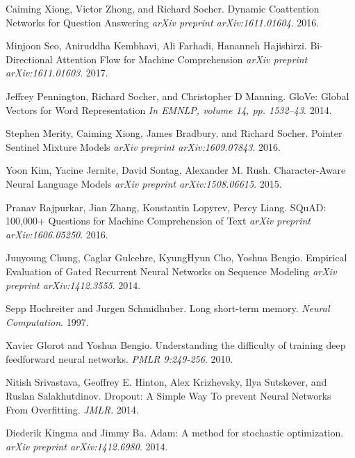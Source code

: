 \documentclass{article} %
\begin{document}
\begin{thebibliography}{1}

\small{

 Caiming Xiong, Victor Zhong, and Richard Socher. Dynamic Coattention Networks for Question Answering
 {\em arXiv preprint arXiv:1611.01604}. 2016.

Minjoon Seo, Aniruddha Kembhavi, Ali Farhadi, Hananneh Hajishirzi. Bi-Directional Attention Flow for Machine Comprehension
 {\em arXiv preprint arXiv:1611.01603}. 2017.

Jeffrey Pennington, Richard Socher, and Christopher D Manning. GloVe: Global Vectors for Word Representation
 {\em In EMNLP, volume 14, pp. 1532–43}. 2014.

Stephen Merity, Caiming Xiong, James Bradbury, and Richard Socher. Pointer Sentinel Mixture Models
 {\em arXiv preprint arXiv:1609.07843}. 2016.

Yoon Kim, Yacine Jernite, David Sontag, Alexander M. Rush. Character-Aware Neural Language Models
 {\em arXiv preprint arXiv:1508.06615}. 2015.

Pranav Rajpurkar, Jian Zhang, Konstantin Lopyrev, Percy Liang. SQuAD: 100,000+ Questions for Machine Comprehension of Text
 {\em arXiv preprint arXiv:1606.05250}. 2016.

Junyoung Chung, Caglar Gulcehre, KyungHyun Cho, Yoshua Bengio. 
Empirical Evaluation of Gated Recurrent Neural Networks on Sequence Modeling
 {\em arXiv preprint arXiv:1412.3555}. 2014.

Sepp Hochreiter and Jurgen Schmidhuber. Long short-term memory. 
 {\em Neural Computation}. 1997.

Xavier Glorot and Yoshua Bengio. Understanding the difficulty of training deep feedforward neural networks. 
 {\em PMLR 9:249-256}. 2010.

Nitish Srivastava, Geoffrey E. Hinton, Alex Krizhevsky, Ilya Sutskever, and Ruslan Salakhutdinov. Dropout: A Simple Way To prevent Neural Networks From Overfitting.
 {\em JMLR}. 2014.

Diederik Kingma and Jimmy Ba. Adam: A method for stochastic optimization.
 {\em arXiv preprint arXiv:1412.6980}. 2014.

}

\end{thebibliography}
\end{document}
